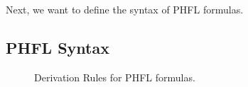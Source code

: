 Next, we want to define the syntax of PHFL formulas.

\subsection{PHFL Syntax}\label{subsec:phflSyntax}

\begin{figure}
    \caption{Derivation Rules for PHFL formulas.}
    \label{figure:phfl-typing-rules}
\end{figure}


